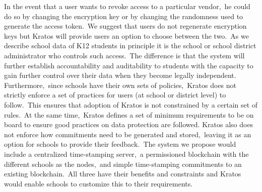 \documentclass{article}
\begin{document}
\bigbreak
In the event that a user wants to revoke access to a particular vendor,\ he could do so by changing the encryption key or by changing the randomness used to generate the access token.\ We suggest that users do not regenerate encryption keys but Kratos will provide users an option to choose between the two.\ As we describe school data of K12 students in principle it is the school or school district administrator who controls such access.\ The difference is that the system will further establish accountability and auditability to students with the capacity to gain further control over their data when they become legally independent.
\bigbreak
Furthermore,\ since schools have their own sets of policies,\ Kratos does not strictly enforce a set of practices for users (at school or district level) to follow.\ This ensures that adoption of Kratos is not constrained by a certain set of rules.\ At the same time,\ Kratos defines a set of minimum requirements to be on board to ensure good practices on data protection are followed.
\bigbreak
Kratos also does not enforce how commitments need to be generated and stored,\ leaving it as an option for schools to provide their feedback.\ The system we propose would include a centralized time-stamping server,\ a permissioned blockchain with the different schools as the nodes,\ and simple time-stamping commitments to an existing blockchain.\ All three have their benefits and constraints and Kratos would enable schools to customize this to their requirements.
\bigbreak
\end{document}
